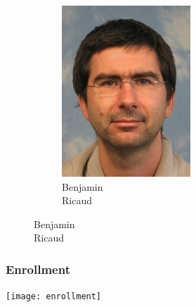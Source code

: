 \documentclass[aspectratio=169]{beamer}
\begin{document}
\begin{frame}
\begin{figure}
\begin{subfigure}[b]{0.14\linewidth}
			\includegraphics[width=\linewidth]{picture_benjamin}
			\caption*{Benjamin\\Ricaud}
		\end{subfigure}
	\end{figure}
\end{frame}


\begin{frame}
	\frametitle{Enrollment}
	\centering
	\texttt{[image: enrollment]}
\end{frame}

\end{document}
